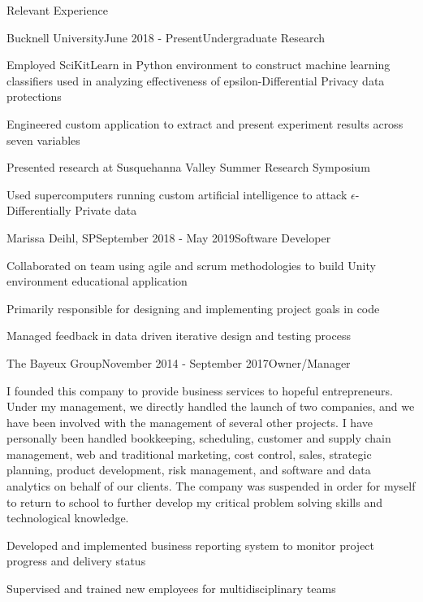 \documentclass{resume} %
\begin{document}

\begin{rSection}{Relevant Experience}


\begin{rSubsection}{Bucknell University}{June 2018 - Present}{Undergraduate Research}{}
\item Employed SciKitLearn in Python environment to construct machine learning classifiers used in analyzing effectiveness of epsilon-Differential Privacy data protections
\item Engineered custom application to extract and present experiment results across seven variables
\item Presented research at Susquehanna Valley Summer Research Symposium
\item Used supercomputers running custom artificial intelligence to attack $\epsilon$-Differentially Private data
\end{rSubsection}


\begin{rSubsection}{Marissa Deihl, SP}{September 2018 - May 2019}{Software Developer}{}
\item Collaborated on team using agile and scrum methodologies to build Unity environment educational application
\item Primarily responsible for designing and implementing project goals in code
\item Managed feedback in data driven iterative design and testing process
\end{rSubsection}


\begin{rSubsection}{The Bayeux Group}{November 2014 - September 2017}{Owner/Manager}{}
\item I founded this company to provide business services to hopeful entrepreneurs. Under my management, we directly handled the launch of two companies, and we have been involved with the management of several other projects. I have personally been handled bookkeeping, scheduling, customer and supply chain management, web and traditional marketing, cost control, sales, strategic planning, product development, risk management, and software and data analytics on behalf of our clients. The company was suspended in order for myself to return to school to further develop my critical problem solving skills and technological knowledge.
\item Developed and implemented business reporting system to monitor project progress and delivery status
\item Supervised and trained new employees for multidisciplinary teams
\end{rSubsection}


\end{rSection}
\end{document}
